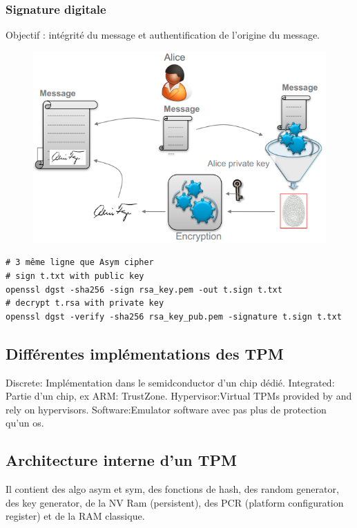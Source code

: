 \subsubsection{Signature digitale}
Objectif : intégrité du message et authentification de l'origine du message. 
\begin{figure}[H]
\centering
\includegraphics[width=0.9\columnwidth]{Figures/tpm_01.png}
\end{figure}
\begin{Verbatim}[breaklines=true, breakanywhere=true]
# 3 même ligne que Asym cipher
# sign t.txt with public key
openssl dgst -sha256 -sign rsa_key.pem -out t.sign t.txt
# decrypt t.rsa with private key
openssl dgst -verify -sha256 rsa_key_pub.pem -signature t.sign t.txt
\end{Verbatim}
\subsection{Différentes implémentations des TPM}
Discrete: Implémentation dans le semidconductor d'un chip dédié.
Integrated: Partie d'un chip, ex ARM: TrustZone.
Hypervisor:Virtual TPMs provided by and rely on hypervisors.
Software:Emulator software avec pas plus de protection qu'un os.
\subsection{Architecture interne d'un TPM}
Il contient des algo asym et sym, des fonctions de hash, des random generator, des key generator, de la NV Ram (persistent), des PCR (platform configuration register) et de la RAM classique.
